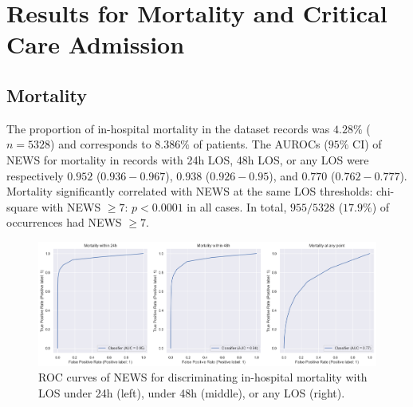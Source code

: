 \documentclass[10pt,journal, compsoc]{IEEEtran}
\begin{document}
\section{Results for Mortality and Critical Care Admission}
\label{appendix:criticalevent_breakdown}
\subsection{Mortality}
The proportion of in-hospital mortality in the dataset records was $4.28\%$ ($n=5328$) and corresponds to $8.386\%$ of patients. The AUROCs ($95\%$ CI) of NEWS for mortality in records with 24h LOS, 48h LOS, or any LOS were respectively $0.952$ ($0.936-0.967$), $0.938$ ($0.926-0.95$), and $0.770$ ($0.762-0.777$). Mortality significantly correlated with NEWS at the same LOS thresholds: chi-square with NEWS $\geq 7$: $p < 0.0001$ in all cases. In total, $955/5328$ ($17.9\%$) of occurrences had NEWS $\geq 7$.
\begin{figure}[htbp]
    \centering
    \includegraphics[width=\textwidth]{img/mortality_roc.png}
    \caption{ROC curves of NEWS for discriminating in-hospital mortality with LOS under 24h (left), under 48h (middle), or any LOS (right).}
    \label{fig:mortality_roc}
\end{figure}
\end{document}
